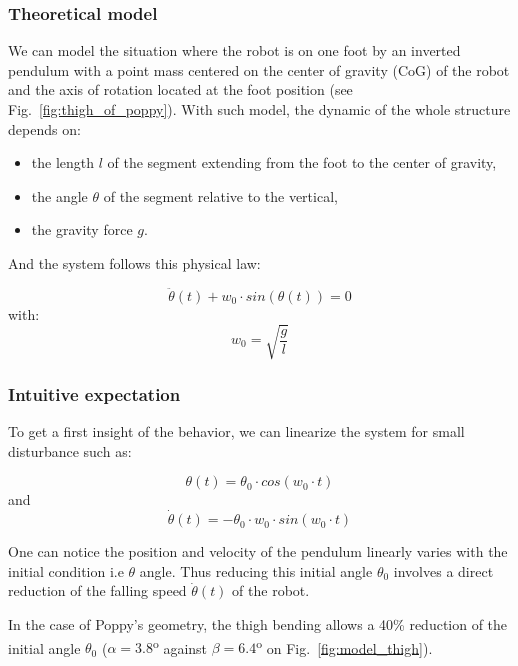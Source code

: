 \subsubsection{Theoretical model} %
\label{sub:exp_theoritical_model}

We can model the situation where the robot is on one foot by an inverted pendulum with a point mass centered on the center of gravity (CoG) of the robot and the axis of rotation located at the foot position (see Fig.~\ref{fig:thigh_of_poppy}). With such model, the dynamic of the whole structure depends on:

\begin{itemize}
    \item the length $l$ of the segment extending from the foot to the center of gravity,
    \item the angle $\theta$ of the segment relative to the vertical,
    \item the gravity force $g$.
\end{itemize}

And the system follows this physical law:

\begin{equation}
    \ddot{\theta}(t) + w_0 \cdot sin(\theta(t)) = 0
\end{equation}
with:
\begin{equation}
    w_0 = \sqrt{\frac{g}{l}}
\end{equation}

\subsubsection{Intuitive expectation} %

To get a first insight of the behavior, we can linearize the system for small disturbance such as:

\begin{equation}
    \theta(t) = \theta_0 \cdot cos(w_0\cdot t)
\end{equation}
and
\begin{equation}
    \dot{\theta}(t) = -\theta_0 \cdot w_0 \cdot sin(w_0\cdot t)
\end{equation}

One can notice the position and velocity of the pendulum linearly varies with the initial condition i.e $\theta$ angle. Thus reducing this initial angle $\theta_0$ involves a direct reduction of the falling speed $\dot{\theta}(t)$ of the robot.

In the case of Poppy's geometry, the thigh bending allows a 40\% reduction of the initial angle $\theta_0$ ($\alpha = 3.8$\textsuperscript{o} against $ \beta = 6.4$\textsuperscript{o} on Fig.~\ref{fig:model_thigh}).

